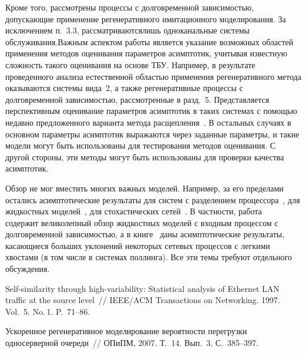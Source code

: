 \begin{multicols}{2}
Кроме того,
рассмотрены процессы с долговременной зави\-си\-мостью,
 допускающие применение регенеративного имитационного моделирования. За
исключением п.~3.3, рассматриваются\linebreak лишь одноканальные сис\-те\-мы
обслуживания.\linebreak Важным аспектом работы является указание возможных
областей применения методов оценивания параметров асимптотик,
учитывая известную сложность такого оценивания на основе ТБУ.
Например, в результате проведенного анализа естественной областью
применения регенеративного метода оказываются сис\-те\-мы вида~2, а
также регенеративные процессы с долговременной зависимостью,
рас\-смот\-рен\-ные в разд.~5. Представляется перспективным оценивание
параметров асимптотик в таких сис\-те\-мах с помощью недавно предложенного
 варианта метода расщепления~\cite {BorMor}. В
остальных случаях в основном параметры асимптотик выражаются через
заданные параметры, и такие модели могут быть использованы для
тестирования методов оценивания. С другой стороны, эти методы могут
быть использованы для проверки качества асимптотик.

 Обзор не мог вместить многих важных моделей. Например, за его пределами остались асимптотические
результаты для сис\-тем с разделением процессора~\cite{Zwart}, для
жидкостных моделей~\cite{BoxmaDumas1, Jelenkovic}, для
стохастических сетей~\cite{Sigman98, BF,Borovkov}. В частности,
работа~\cite{BoxmaDumas1} содержит великолепный обзор жидкостных
моделей с входным процессом с долговременной зависимостью, а в книге~\cite{Borovkov}
даны асимптотические результаты, касающиеся больших уклонений некоторых сетевых процессов с легкими хвостами (в том
числе в системах поллинга). Все эти темы требуют отдельного обсуждения.
\vspace*{-6pt}

{\small\frenchspacing
{%
\begin{thebibliography}{99}

Self-similarity through high-variability: Statistical analysis
of Ethernet LAN traffic at the source level~// IEEE/ACM Transactions
on Networking. 1997. Vol.~5. No.\,1. P.~71--86.

Ускоренное регенеративное
моделирование вероятности перегрузки односерверной очереди~// ОПиПМ,
2007. Т.~14. Вып.~3. С.~385--397.


\end{thebibliography}}}
\end{multicols}
